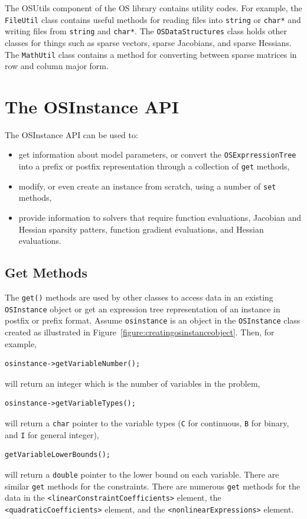 \documentclass[11pt]{article}
\newcounter{Fig}
\renewcommand{\_}{{\char"5F}}
\renewcommand{\{}{{\char"7B}}
\renewcommand{\}}{{\char"7D}}
\renewcommand{\^}{{\char"0D}}
\renewcommand{\'}{{\char"0D}}
\begin{document}
\begin{enumerate}[Step 1:]
The OSUtils component of the OS library contains utility codes. For example, the {\tt FileUtil} class contains 
useful methods for reading files into {\tt string} or {\tt char*} and writing files from {\tt string} and {\tt char*}.  
The {\tt OSDataStructures} class holds other classes for things such as sparse vectors, sparse Jacobians, and sparse 
Hessians. The {\tt MathUtil} class contains a method for converting between sparse matrices in row and column major form.


\section{The  OSInstance API}\label{section:osinstanceAPI}

The OSInstance API can be used to:

\begin{itemize}

\item  get information about model parameters, or convert the {\tt OSExprressionTree} into a prefix or postfix 
representation through a collection  of {\tt get} methods,

\item modify, or even create an instance from scratch, using a number of {\tt set} methods,

\item provide information to solvers that require function evaluations, Jacobian and Hessian sparsity patters,  function gradient evaluations, and Hessian evaluations.

\end{itemize}



\subsection{Get Methods}

The {\tt get()} methods are used by other classes to access data in an existing {\tt OSInstance} object or get an expression tree representation of an instance in postfix or prefix format.   Assume {\tt osinstance} is an object in the {\tt OSInstance} class created as illustrated in Figure~\ref{figure:creatingosinstanceobject}. Then, for example,
\begin{verbatim}
osinstance->getVariableNumber();
\end{verbatim}
will return an integer which is the number of variables in the problem,
\begin{verbatim}
osinstance->getVariableTypes();
\end{verbatim}
will return a {\tt char} pointer to the variable types ({\tt C} for continuous, {\tt B} for binary, and {\tt I} for general integer),
\begin{verbatim}
getVariableLowerBounds();
\end{verbatim}
will  return a {\tt double} pointer to the lower bound on each variable. There are similar {\tt get} methods for the constraints. There are numerous {\tt get} methods for the data in the {\tt <linearConstraintCoefficients>}  element, the {\tt <quadraticCoefficients>} element, and the {\tt <nonlinearExpressions>} element.


\end{enumerate}
\end{document}
